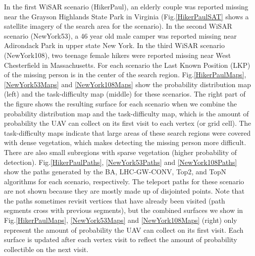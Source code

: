 In the first WiSAR scenario (HikerPaul), an elderly couple was reported missing near the Grayson Highlands State Park in Virginia (Fig.\ref{HikerPaulSAT} shows a satellite imagery of the search area for the scenario). In the second WiSAR scenario (NewYork53), a 46 year old male camper was reported missing near Adirondack Park in upper state New York. In the third WiSAR scenario (NewYork108), two teenage female hikers were reported missing near West Chesterfield in Massachusetts. For each scenario the Last Known Position (LKP) of the missing person is in the center of the search region. Fig.\ref{HikerPaulMaps}, \ref{NewYork53Maps} and \ref{NewYork108Maps} show the probability distribution map (left) and the task-difficulty map (middle) for these scenarios. The right part of the figure shows the resulting surface for each scenario when we combine the probability distribution map and the task-difficulty map, which is the amount of probability the UAV can collect on its first visit to each vertex (or grid cell). The task-difficulty maps indicate that large areas of these search regions were covered with dense vegetation, which makes detecting the missing person more difficult. There are also small subregions with sparse vegetation (higher probability of detection). Fig.\ref{HikerPaulPaths}, \ref{NewYork53Paths} and \ref{NewYork108Paths} show the paths generated by the BA, LHC-GW-CONV, Top2, and TopN algorithms for each scenario, respectively. The teleport paths for these scenario are not shown because they are mostly made up of disjointed points. Note that the paths sometimes revisit vertices that have already been visited (path segments cross with previous segments), but the combined surfaces we show in Fig.\ref{HikerPaulMaps}, \ref{NewYork53Maps} and \ref{NewYork108Maps} (right) only represent the amount of probability the UAV can collect on its first visit. Each surface is updated after each vertex visit to reflect the amount of probability collectible on the next visit.



